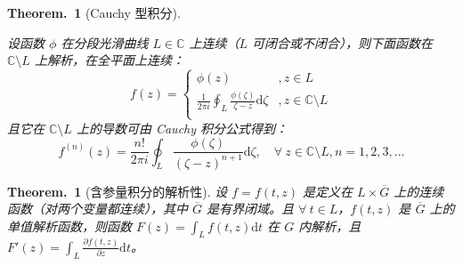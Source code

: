 \documentclass[UTF8]{report}
\def\C{\mathbb{C}}
\theoremstyle{MyLineTheoremStyle} %
\theoremstyle{MyBlockTheoremStyle} %
\newtheorem{BlockTheorem}[LineTheorem]{Theorem.\,} %
\theoremstyle{MySubsubsectionStyle} %
\begin{document}
\begin{BlockTheorem}[Cauchy 型积分]\label{Cauchy 型积分}

设函数 $\phi$ 在分段光滑曲线 $L \in \C$ 上连续（$L$ 可闭合或不闭合），则下面函数在 $\C \setminus L$ 上解析，在全平面上连续：
\begin{equation}
f (z) = 
\begin{cases}
    \phi(z) &, z \in L \\
    \displaystyle \frac{1}{2\pi i}\oint_{L} \frac{\phi(\zeta)}{\zeta - z} \mathrm{d} \zeta &, z \in \C \setminus L \\ 
\end{cases}
\end{equation}
且它在 $\C \setminus L$ 上的导数可由 Cauchy 积分公式得到：
\begin{equation}
f^{(n)}(z) = \frac{n !}{2\pi i}\oint_{L} \frac{\phi(\zeta)}{(\zeta - z)^{n+1}} \mathrm{d} \zeta,\quad \forall\ z \in \C \setminus L, n = 1,2,3,...
\end{equation}

\end{BlockTheorem}

\begin{BlockTheorem}[含参量积分的解析性]\label{含参量积分的解析性}
设 $f = f(t,z)$ 是定义在 $L \times \overline{G} $ 上的连续函数（对两个变量都连续），其中 $\overline{G} $ 是有界闭域。且 $\forall\ t \in L$，$f(t,z)$ 是 $\overline{G}$ 上的单值解析函数，则函数 $\displaystyle F(z) = \int_{L} f(t,z) \mathrm{d}t$
在 $G$ 内解析，且 $\displaystyle F'(z) =  \int_{L} \frac{\partial f(t,z) }{\partial z } \mathrm{d}t$。
\end{BlockTheorem}
\end{document}
